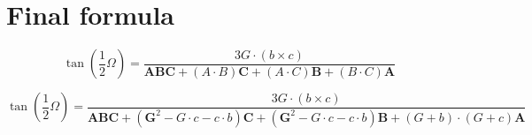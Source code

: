 \documentclass[10pt,a4paper]{article}
\begin{document}
\section{Final formula}


$$
{\displaystyle \tan \left({\frac {1}{2}}\Omega \right)
  = {\frac {3 G \cdot \left( b \times c \right)}
    {\mathbf{A}\mathbf{B}\mathbf{C} + \left({A}\cdot {B}\right)\mathbf{C}
      + \left({A}\cdot {C}\right)\mathbf{B}
      + \left({B}\cdot {C}\right)\mathbf{A}}}}
$$


$$
{\displaystyle \tan \left({\frac {1}{2}}\Omega \right)
  = {\frac {3 G \cdot \left( b \times c \right)}
    {\mathbf{A}\mathbf{B}\mathbf{C} +
    (\mathbf{G}^2 - G \cdot c - c \cdot b)\mathbf{C}
      + (\mathbf{G}^2 - G \cdot c - c \cdot b)\mathbf{B}
      + \left( G + b \right) \cdot \left( G + c \right) \mathbf{A}
      }}}
$$
\end{document}
